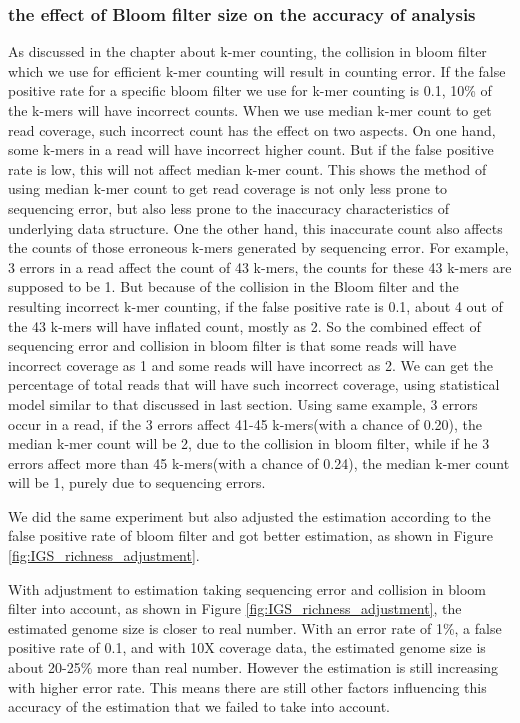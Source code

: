 \subsubsection{the effect of Bloom filter size on the accuracy of analysis}
As discussed in the chapter about k-mer counting, the collision in bloom filter
which we use for efficient k-mer counting will result in counting error. If the
false positive rate for a specific bloom filter we use for k-mer counting is
0.1, 10\% of the k-mers will have incorrect counts. When we use median k-mer
count to get read coverage, such incorrect count has the effect on two aspects.
On one hand, some k-mers in a read will have incorrect higher count. But if the
 false
positive rate is low, this will not affect median k-mer count. This shows the
method of using median k-mer count to get read coverage is not only less prone
to sequencing error, but also less prone to the inaccuracy characteristics of
underlying data structure. One the other hand, this inaccurate count also
affects the counts of those erroneous k-mers generated by sequencing error. For
example, 3 errors in a read affect the count of 43 k-mers, the counts for these
43 k-mers are supposed to be 1. But because of the collision in the Bloom filter
and the resulting incorrect k-mer counting, if the false positive rate is 0.1,
about 4 out of the 43 k-mers will have inflated count, mostly as 2. So the
combined effect of sequencing error and collision in bloom filter is that some
reads will have incorrect coverage as 1 and some reads will have incorrect as
2. We can get the percentage of total reads that will have such incorrect
coverage, using statistical model similar to that discussed in last section.
Using same example, 3 errors occur in a read, if the 3 errors affect 41-45
k-mers(with a chance of 0.20), the median k-mer count will be 2, due to the 
collision in bloom filter, while if he 3 errors affect more than 45 k-mers(with 
a chance of 0.24), the median k-mer count will be 1, purely due to sequencing 
errors. 

We did the same experiment but also adjusted the estimation according to the 
false positive rate of bloom filter and got better estimation, as shown in
Figure \ref{fig:IGS_richness_adjustment}.

With adjustment to estimation taking sequencing error and collision in bloom
filter into account, as shown in Figure \ref{fig:IGS_richness_adjustment}, the 
estimated genome size is closer to real number. With an error rate of 1\%,
a false positive rate of 0.1, and with 10X coverage data, the estimated genome size
is about 20-25\% more than real number. However the estimation is still 
increasing with higher
error rate. This means there are still other factors influencing this
accuracy of the estimation that we failed to take into account.


